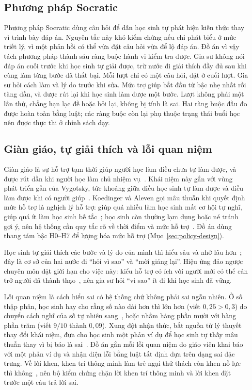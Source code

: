 \subsection{Phương pháp Socratic}\label{sec:socratic-ref}
Phương pháp Socratic dùng câu hỏi để dẫn học sinh tự phát hiện kiến thức thay vì trình bày đáp án. Nguyên tắc này khó kiểm chứng nếu chỉ phát biểu ở mức triết lý, vì một phản hồi có thể vừa đặt câu hỏi vừa để lộ đáp án. Đồ án vì vậy tách phương pháp thành sáu ràng buộc hành vi kiểm tra được. Gia sư không nói đáp án cuối trước khi học sinh tự giải được, trừ nước đi giải thích đầy đủ sau khi cùng làm từng bước đã thất bại. Mỗi lượt chỉ có một câu hỏi, đặt ở cuối lượt. Gia sư hỏi cách làm và lý do trước khi sửa. Mức trợ giúp bắt đầu từ bậc nhẹ nhất rồi tăng dần, và được rút lại khi học sinh làm được một bước. Lượt không phải một lần thử, chẳng hạn lạc đề hoặc hỏi lại, không bị tính là sai. Hai ràng buộc đầu đo được hoàn toàn bằng luật; các ràng buộc còn lại phụ thuộc trạng thái buổi học nên được thực thi ở chính sách dạy.

\subsection{Giàn giáo, tự giải thích và lỗi quan niệm}
Giàn giáo là sự hỗ trợ tạm thời giúp người học làm điều chưa tự làm được, và được rút dần khi người học làm chủ nhiệm vụ~\cite{wood1976}. Khái niệm này gắn với vùng phát triển gần của Vygotsky, tức khoảng giữa điều học sinh tự làm được và điều làm được khi có người giúp~\cite{vygotsky1978}. Koedinger và Aleven gọi mâu thuẫn khi quyết định mức hỗ trợ là nghịch lý hỗ trợ: giúp quá nhiều làm học sinh mất cơ hội tự nghĩ, giúp quá ít làm học sinh bế tắc~\cite{koedinger2007}; học sinh còn thường lạm dụng hoặc né tránh gợi ý, nên hệ thống cần quy tắc rõ về thời điểm và mức hỗ trợ~\cite{aleven2016}. Đồ án dùng thang tám bậc H0--H7 để lượng hóa mức hỗ trợ (Mục~\ref{sec:policy-design}).

Học sinh tự giải thích các bước và lý do của mình thì hiểu sâu và nhớ lâu hơn~\cite{chi1989,chi1994,chi2001}; đây là cơ sở của hai nước đi ``hỏi vì sao'' và ``mời giảng lại''. Hiệu ứng đảo ngược chuyên môn đặt giới hạn cho việc này: kiểu hỗ trợ có ích với người mới có thể cản trở người đã thành thạo~\cite{kalyuga2003}, nên gia sư hỏi ``vì sao'' ít đi khi học sinh đã vững.

Lỗi quan niệm là cách hiểu sai có hệ thống chứ không phải sai ngẫu nhiên. Ở số thập phân, học sinh hay cho rằng số nào dài hơn thì lớn hơn (viết $0{,}25>0{,}3$) do chuyển cách nghĩ của số tự nhiên sang~\cite{resnick1989}, hoặc nhầm hàng phần mười với hàng phần trăm (viết $9/10$ thành $0{,}09$). Xung đột nhận thức, bắt nguồn từ lý thuyết thay đổi khái niệm, đưa cho học sinh một phản ví dụ để học sinh tự thấy mâu thuẫn thay vì bị báo là sai~\cite{posner1982}. Đồ án gắn mỗi lỗi quan niệm do giáo viên khai báo với một phản ví dụ và nhận diện lỗi bằng luật tất định dựa trên dạng sai đặc trưng. Về lời khen, khen trí thông minh làm trẻ ngại thử thách còn khen nỗ lực thì không~\cite{mueller1998}, nên bộ kiểm chứng chặn lời khen trí thông minh và lời khen đặt trước một câu trả lời sai.


